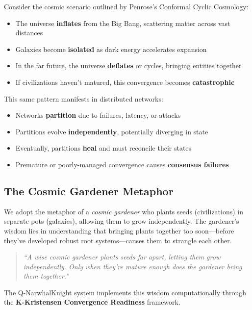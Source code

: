 \documentclass[12pt,a4paper]{article}
\begin{document}
Consider the cosmic scenario outlined by Penrose's Conformal Cyclic Cosmology:
\begin{itemize}
    \item The universe \textbf{inflates} from the Big Bang, scattering matter across vast distances
    \item Galaxies become \textbf{isolated} as dark energy accelerates expansion
    \item In the far future, the universe \textbf{deflates} or cycles, bringing entities together
    \item If civilizations haven't matured, this convergence becomes \textbf{catastrophic}
\end{itemize}

This same pattern manifests in distributed networks:
\begin{itemize}
    \item Networks \textbf{partition} due to failures, latency, or attacks
    \item Partitions evolve \textbf{independently}, potentially diverging in state
    \item Eventually, partitions \textbf{heal} and must reconcile their states
    \item Premature or poorly-managed convergence causes \textbf{consensus failures}
\end{itemize}

\subsection{The Cosmic Gardener Metaphor}

We adopt the metaphor of a \textit{cosmic gardener} who plants seeds (civilizations) in separate
pots (galaxies), allowing them to grow independently. The gardener's wisdom lies in understanding
that bringing plants together too soon---before they've developed robust root systems---causes
them to strangle each other.

\begin{quote}
\textit{``A wise cosmic gardener plants seeds far apart, letting them grow independently.
Only when they're mature enough does the gardener bring them together.''}
\end{quote}

The Q-NarwhalKnight system implements this wisdom computationally through the
\textbf{K-Kristensen Convergence Readiness} framework.

\end{document}
